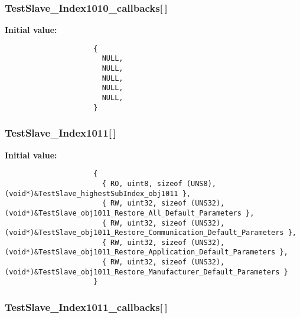 \subsubsection{ {\bf Test\-Slave\_\-Index1010\_\-callbacks}[$\,$]}\label{TestSlave_8c_effc376a3cba109df4233de0c001562f}


\textbf{Initial value:}

\begin{Code}\begin{verbatim} 
                     {
                       NULL,
                       NULL,
                       NULL,
                       NULL,
                       NULL,
                     }
\end{verbatim}\end{Code}
\subsubsection{ {\bf Test\-Slave\_\-Index1011}[$\,$]}\label{TestSlave_8c_dd203d8d0129ae31346f27dd9eb60561}


\textbf{Initial value:}

\begin{Code}\begin{verbatim} 
                     {
                       { RO, uint8, sizeof (UNS8), (void*)&TestSlave_highestSubIndex_obj1011 },
                       { RW, uint32, sizeof (UNS32), (void*)&TestSlave_obj1011_Restore_All_Default_Parameters },
                       { RW, uint32, sizeof (UNS32), (void*)&TestSlave_obj1011_Restore_Communication_Default_Parameters },
                       { RW, uint32, sizeof (UNS32), (void*)&TestSlave_obj1011_Restore_Application_Default_Parameters },
                       { RW, uint32, sizeof (UNS32), (void*)&TestSlave_obj1011_Restore_Manufacturer_Default_Parameters }
                     }
\end{verbatim}\end{Code}
\subsubsection{ {\bf Test\-Slave\_\-Index1011\_\-callbacks}[$\,$]}\label{TestSlave_8c_2ace0491b7b39ffbc59c0b9538306758}


